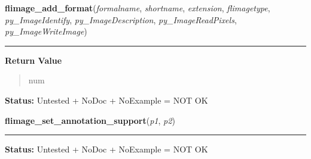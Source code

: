 \hspace{.8\funcindent}\begin{boxedminipage}{\funcwidth}

    \raggedright \textbf{flimage\_add\_format}(\textit{formalname}, \textit{shortname}, \textit{extension}, \textit{flimagetype}, \textit{py\_ImageIdentify}, \textit{py\_ImageDescription}, \textit{py\_ImageReadPixels}, \textit{py\_ImageWriteImage})

    \vspace{-1.5ex}

    \rule{\textwidth}{0.5\fboxrule}
\setlength{\parskip}{2ex}
\setlength{\parskip}{1ex}
      \textbf{Return Value}
    \vspace{-1ex}

      \begin{quote}
      num

      \end{quote}

\textbf{Status:} Untested + NoDoc + NoExample = NOT OK



    \end{boxedminipage}

    \label{xformslib:library:flimage_set_annotation_support}

    \vspace{0.5ex}

\hspace{.8\funcindent}\begin{boxedminipage}{\funcwidth}

    \raggedright \textbf{flimage\_set\_annotation\_support}(\textit{p1}, \textit{p2})

    \vspace{-1.5ex}

    \rule{\textwidth}{0.5\fboxrule}
\setlength{\parskip}{2ex}
\setlength{\parskip}{1ex}
\textbf{Status:} Untested + NoDoc + NoExample = NOT OK



    \end{boxedminipage}

    \label{xformslib:library:flimage_getcolormap}

    \vspace{0.5ex}

